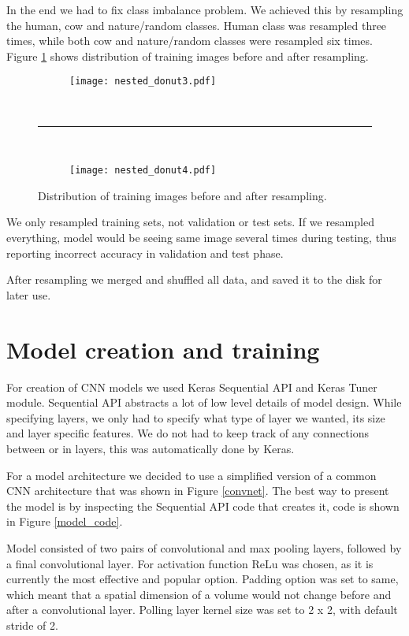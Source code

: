 In the end we had to fix class imbalance problem.
We achieved this by resampling the human, cow and nature/random classes.
Human class was resampled three times, while both cow and nature/random classes were resampled six times.
Figure \ref{resampled} shows distribution of training images before and after resampling.

\begin{figure}[ht] 
    \begin{subfigure}[b]{1\textwidth}
        \centering
        \texttt{[image: nested\_donut3.pdf]} 
    \end{subfigure}
    \unskip\ \hrule\ 
    \begin{subfigure}[b]{1\textwidth}
        \centering
        \texttt{[image: nested\_donut4.pdf]} 
    \end{subfigure}
    
    \caption{ Distribution of training images before and after resampling.}
    \label{resampled}
\end{figure}

We only resampled training sets, not validation or test sets.
If we resampled everything, model would be seeing same image several times during testing, thus reporting incorrect accuracy in validation and test phase.

After resampling we merged and shuffled all data, and saved it to the disk for later use.


\section{ Model creation and training}\label{cnn_ref}

For creation of CNN models we used Keras Sequential API and Keras Tuner module.
Sequential API abstracts a lot of low level details of model design.
While specifying layers, we only had to specify what type of layer we wanted, its size and layer specific features. 
We do not had to keep track of any connections between or in layers, this was automatically done by Keras.

For a model architecture we decided to use a simplified version of a common CNN architecture that was shown in Figure \ref{convnet}.
The best way to present the model is by inspecting the Sequential API code that creates it, code is shown in Figure \ref{model_code}.

Model consisted of two pairs of convolutional and max pooling layers, followed by a final convolutional layer.
For activation function ReLu was chosen, as it is currently the most effective and popular option\cite{cs231n}\cite{geron}.
Padding option was set to same, which meant that a spatial dimension of a volume would not change before and after a convolutional layer.
Polling layer kernel size was set to 2 x 2, with default stride of 2.

